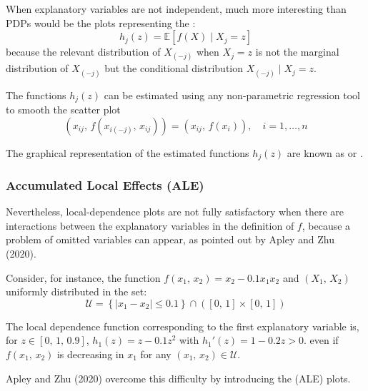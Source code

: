 When explanatory variables are not independent, much more interesting than
PDPs would be the plots representing the :
\begin{equation*}
	h_j(z) = \mathds E \left[
		f(X) \mid X_j = z
		\right]
\end{equation*}
because the relevant distribution of $X_{(-j)}$ when $X_j = z$ is not the
marginal distribution of $X_{(-j)}$ but the conditional distribution
$X_{(-j)} \mid X_j = z$.

The functions $h_j(z)$ can be estimated using any non-parametric
regression tool to smooth the scatter plot
\begin{equation*}
	\left(
	x_{ij},\,f(x_{i(-j)},\,x_{ij})
	\right) = \left(
	x_{ij},\,f(x_i)
	\right),\quad i = 1,\ldots,n
\end{equation*}

The graphical representation of the estimated functions $h_j(z)$ are known
as  or .

\subsubsection{Accumulated Local Effects (ALE)}

Nevertheless, local-dependence plots are not fully satisfactory when there are
interactions between the explanatory variables in the
definition of $f$, because a problem of omitted variables can appear, as
pointed out by Apley and Zhu (2020). %

Consider, for instance, the function $f(x_1,\,x_2) = x_2 - 0.1x_1 x_2$ and
$(X_1,\,X_2)$ uniformly distributed in the set:
\begin{equation*}
	\mathcal U = \left\{
	\left|
	x_1 - x_2
	\right| \leq 0.1
	\right\} \cap \left(
	[0,\,1] \times [0,\,1]
	\right)
\end{equation*}

The local dependence function corresponding to the first explanatory variable is, for
$z \in [0,\,1,\,0.9]$, $h_1(z) = z - 0.1 z^2$ with
$h_1'(z) = 1 - 0.2 z > 0$. even if $f(x_1,\,x_2)$ is decreasing in $x_1$
for any $(x_1,\,x_2) \in \mathcal U$.

Apley and Zhu (2020) overcome this difficulty by introducing the
 (ALE) plots. 

